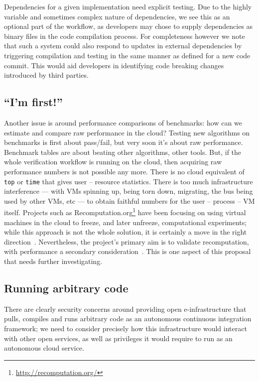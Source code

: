 \documentclass[conference]{IEEEtran}
\begin{document}
Dependencies for a given implementation need explicit testing. Due to
the highly variable and sometimes complex nature of dependencies, we
see this as an optional part of the workflow, as developers may chose
to supply dependencies as binary files in the code compilation
process. For completeness however we note that such a system could
also respond to updates in external dependencies by triggering
compilation and testing in the same manner as defined for a new code
commit. This would aid developers in identifying code breaking changes
introduced by third parties.

\subsection{``I'm first!''}

Another issue is around performance comparisons of benchmarks: how can
we estimate and compare raw performance in the cloud? Testing new
algorithms on benchmarks is first about pass/fail, but very soon it's
about raw performance. Benchmark tables are about beating other
algorithms, other tools. But, if the whole verification workflow is
running on the cloud, then acquiring raw performance numbers is not
possible any more. There is no cloud equivalent of {\texttt{top}} or
{\texttt{time}} that gives user -- resource statistics. There is too
much infrastructure interference --- with VMs spinning up, being torn
down, migrating, the bus being used by other VMs, etc --- to obtain
faithful numbers for the user -- process -- VM itself. Projects such
as Recomputation.org\footnote{\url{http://recomputation.org/}}
have been focusing on using virtual machines in the cloud to freeze,
and later unfreeze, computational experiments; while this approach is
not the whole solution, it is certainly a move in the right
direction~\cite{arabas-et-al:2014}. Nevertheless, the project's
primary aim is to validate recomputation, with performance a secondary
consideration~\cite{gent:2013}. This is one aspect of this proposal
that needs further investigating.

\subsection{Running arbitrary code}

There are clearly security concerns around providing open
e-infrastructure that pulls, compiles and runs arbitrary
code as an autonomous continuous integration framework; we need to
consider precisely how this infrastructure would interact with other
open services, as well as privileges it would require to run as an
autonomous cloud service.
\end{document}
